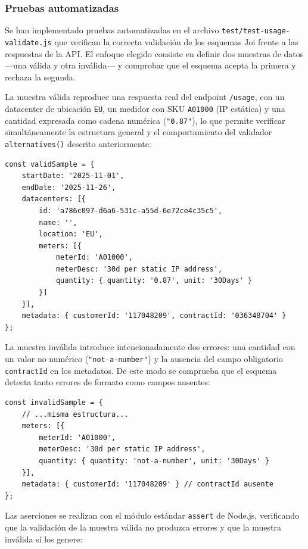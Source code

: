 \subsubsection{Pruebas automatizadas}

Se han implementado pruebas automatizadas en el archivo \texttt{test/test-usage-validate.js} que verifican la correcta validación de los esquemas Joi frente a las respuestas de la API. El enfoque elegido consiste en definir dos muestras de datos ---una válida y otra inválida--- y comprobar que el esquema acepta la primera y rechaza la segunda.

La muestra válida reproduce una respuesta real del endpoint \texttt{/usage}, con un datacenter de ubicación \texttt{EU}, un medidor con SKU \texttt{A01000} (IP estática) y una cantidad expresada como cadena numérica (\texttt{"0.87"}), lo que permite verificar simultáneamente la estructura general y el comportamiento del validador \texttt{alternatives()} descrito anteriormente:

\begin{lstlisting}[caption=Muestra válida para el test de validación, label=lst:valid-sample]
const validSample = {
    startDate: '2025-11-01',
    endDate: '2025-11-26',
    datacenters: [{
        id: 'a786c097-d6a6-531c-a55d-6e72ce4c35c5',
        name: '',
        location: 'EU',
        meters: [{
            meterId: 'A01000',
            meterDesc: '30d per static IP address',
            quantity: { quantity: '0.87', unit: '30Days' }
        }]
    }],
    metadata: { customerId: '117048209', contractId: '036348704' }
};
\end{lstlisting}

La muestra inválida introduce intencionadamente dos errores: una cantidad con un valor no numérico (\texttt{"not-a-number"}) y la ausencia del campo obligatorio \texttt{contractId} en los metadatos. De este modo se comprueba que el esquema detecta tanto errores de formato como campos ausentes:

\begin{lstlisting}[caption=Muestra inválida para el test de validación, label=lst:invalid-sample]
const invalidSample = {
    // ...misma estructura...
    meters: [{
        meterId: 'A01000',
        meterDesc: '30d per static IP address',
        quantity: { quantity: 'not-a-number', unit: '30Days' }
    }],
    metadata: { customerId: '117048209' } // contractId ausente
};
\end{lstlisting}

Las aserciones se realizan con el módulo estándar \texttt{assert} de Node.js, verificando que la validación de la muestra válida no produzca errores y que la muestra inválida sí los genere:

